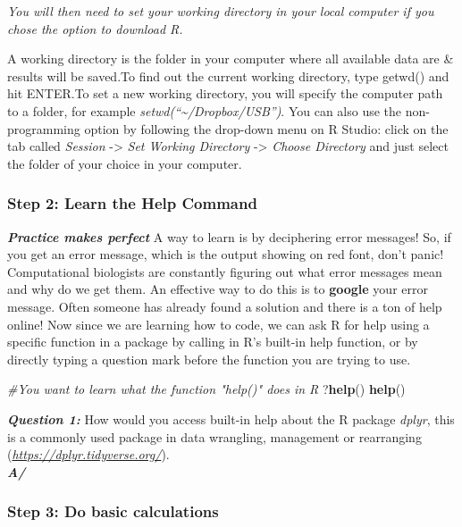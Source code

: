 \documentclass[]{article}
\newenvironment{Shaded}{\begin{snugshade}}{\end{snugshade}}
\newcommand{\CommentTok}[1]{\textcolor[rgb]{0.56,0.35,0.01}{\textit{#1}}}
\newcommand{\KeywordTok}[1]{\textcolor[rgb]{0.13,0.29,0.53}{\textbf{#1}}}
\newcommand{\NormalTok}[1]{#1}
\begin{document}
\emph{You will then need to set your working directory in your local
computer if you chose the option to download R.}

A working directory is the folder in your computer where all available
data are \& results will be saved.To find out the current working
directory, type getwd() and hit ENTER.To set a new working directory,
you will specify the computer path to a folder, for example
\emph{setwd(``\textasciitilde{}/Dropbox/USB'')}. You can also use the
non-programming option by following the drop-down menu on R Studio:
click on the tab called \emph{Session} -\textgreater{} \emph{Set Working
Directory} -\textgreater{} \emph{Choose Directory} and just select the
folder of your choice in your computer.

\hypertarget{step-2-learn-the-help-command}{%
\subsubsection{Step 2: Learn the Help
Command}\label{step-2-learn-the-help-command}}

\textbf{\emph{Practice makes perfect}} A way to learn is by deciphering
error messages! So, if you get an error message, which is the output
showing on red font, don't panic! Computational biologists are
constantly figuring out what error messages mean and why do we get them.
An effective way to do this is to \textbf{google} your error message.
Often someone has already found a solution and there is a ton of help
online! Now since we are learning how to code, we can ask R for help
using a specific function in a package by calling in R's built-in help
function, or by directly typing a question mark before the function you
are trying to use.

\begin{Shaded}
\begin{Highlighting}[]
\CommentTok{#You want to learn what the function "help()" does in R}
\NormalTok{?}\KeywordTok{help}\NormalTok{()}
\KeywordTok{help}\NormalTok{() }
\end{Highlighting}
\end{Shaded}

\textbf{\emph{Question 1:}} How would you access built-in help about the
R package \emph{dplyr}, this is a commonly used package in data
wrangling, management or rearranging
(\emph{\url{https://dplyr.tidyverse.org/}}).\\
\textbf{\emph{A/}}

\hypertarget{step-3-do-basic-calculations}{%
\subsubsection{Step 3: Do basic
calculations}\label{step-3-do-basic-calculations}}
\end{document}
